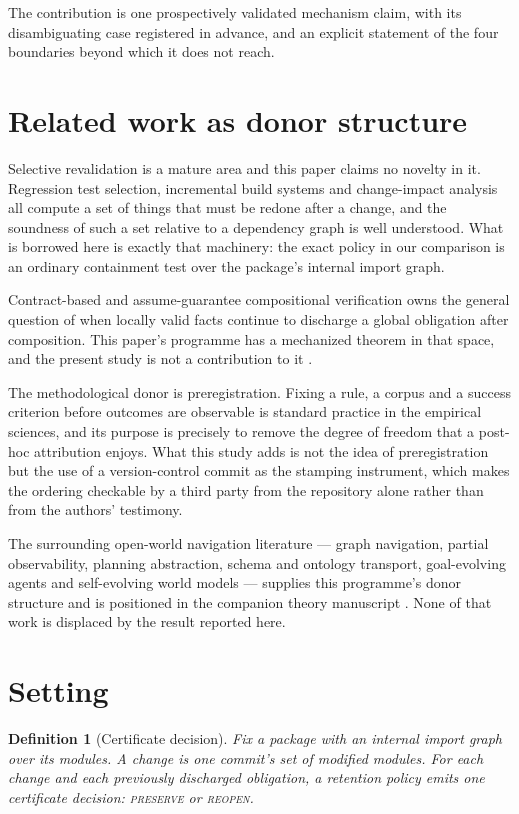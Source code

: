 \documentclass[11pt]{article}
\newtheorem{definition}{Definition}
\begin{document}
The contribution is one prospectively validated mechanism claim, with its disambiguating case registered in advance, and an explicit statement of the four boundaries beyond which it does not reach.

\section{Related work as donor structure}
Selective revalidation is a mature area and this paper claims no novelty in it. Regression test selection, incremental build systems and change-impact analysis all compute a set of things that must be redone after a change, and the soundness of such a set relative to a dependency graph is well understood. What is borrowed here is exactly that machinery: the exact policy in our comparison is an ordinary containment test over the package's internal import graph.

Contract-based and assume-guarantee compositional verification owns the general question of when locally valid facts continue to discharge a global obligation after composition. This paper's programme has a mechanized theorem in that space, and the present study is not a contribution to it \cite{orion17chain}.

The methodological donor is preregistration. Fixing a rule, a corpus and a success criterion before outcomes are observable is standard practice in the empirical sciences, and its purpose is precisely to remove the degree of freedom that a post-hoc attribution enjoys. What this study adds is not the idea of preregistration but the use of a version-control commit as the stamping instrument, which makes the ordering checkable by a third party from the repository alone rather than from the authors' testimony.

The surrounding open-world navigation literature --- graph navigation, partial observability, planning abstraction, schema and ontology transport, goal-evolving agents and self-evolving world models --- supplies this programme's donor structure and is positioned in the companion theory manuscript \cite{sog2025,banihashemi2017,dong2025,saga2025,sewm2026,categorical2026,sheaf2026}. None of that work is displaced by the result reported here.

\section{Setting}
\begin{definition}[Certificate decision]
Fix a package with an internal import graph over its modules. A \emph{change} is one commit's set of modified modules. For each change and each previously discharged obligation, a retention policy emits one \emph{certificate decision}: \textsc{preserve} or \textsc{reopen}.
\end{definition}
\end{document}
